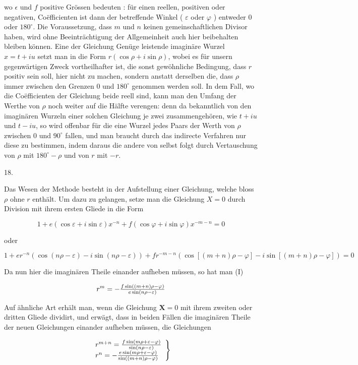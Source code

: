 \documentclass[twoside,12pt, showframe]{memoir}
\let\oldfrac\frac
\def\frac#1#2{\mathchoice{\tfrac{#1}{#2}}{\oldfrac{#1}{#2}}{\genfrac{}{}{}{2}{#1}{#2\mathstrut}}{\genfrac{}{}{}{3}{#1}{#2\mathstrut}}}
\begin{document}
wo \(\epsilon\) und \(f\) positive Grössen bedeuten : für einen reellen, positiven oder negativen, Coëfficienten ist dann der betreffende Winkel ( \(\varepsilon\) oder \(\varphi\) ) entweder 0 oder \(180^{\circ}\). Die Voraussetzung, dass \(m\) und \(n\) keinen gemeinschaftlichen Divisor haben, wird ohne Beeinträchtigung der Allgemeinheit auch hier beibehalten bleiben können. Eine der Gleichung Genüge leistende imaginäre Wurzel \(x=t+i u\) setzt man in die Form \(r(\cos \rho+i \sin \rho)\), wobei es für unsern gegenwärtigen Zweck
vortheilhafter ist, die sonst gewöhnliche Bedingung, dass \(r\) positiv sein soll, hier nicht zu machen, sondern anstatt derselben die, dass \(\rho\) immer zwischen den Grenzen 0 und \(180^{\circ}\) genommen werden soll. In dem Fall, wo die Coëfficienten der Gleichung beide reell sind, kann man den Umfang der Werthe von \(\rho\) noch weiter auf die Hälfte verengen: denn da bekanntlich von den imaginären Wurzeln einer solchen Gleichung je zwei zusammengehören, wie \(t+i u\) und \(t-i u\), so wird offenbar für die eine Wurzel jedes Paars der Werth von \(\rho\) zwischen 0 und \(90^{\circ}\) fallen, und man braucht durch das indirecte Verfahren nur diese zu bestimmen, indem daraus die andere von selbst folgt durch Vertauschung von \(\rho\) mit \(180^{\circ}-\rho\) und von \(r\) mit \(-r\).

18.

Das Wesen der Methode besteht in der Aufstellung einer Gleichung, welche bloss \(\rho\) ohne \(r\) enthält. Um dazu zu gelangen, setze man die Gleichung \(X=0\) durch Division mit ihrem ersten Gliede in die Form

\[
1+e(\cos \varepsilon+i \sin \varepsilon) x^{-n}+f(\cos \varphi+i \sin \varphi) x^{-m-n}=0
\]

oder

\(1+e r^{-n}(\cos (n \rho-\varepsilon)-i \sin (n \rho-\varepsilon))+f r^{-m-n}(\cos [(m+n) \rho-\varphi]-i \sin [(m+n) \rho-\varphi])=0\)

Da nun hier die imaginären Theile einander aufheben müssen, so hat man (I)

\[
r^{m}=-\frac{f \sin ((m+n) \rho-\varphi)}{e \sin (n \rho-\varepsilon)}
\]

Auf ähnliche Art erhält man, wenn die Gleichung \(\boldsymbol{X}=0\) mit ihrem zweiten oder dritten Gliede dividirt, und erwägt, dass in beiden Fällen die imaginären Theile der neuen Gleichungen einander aufheben müssen, die Gleichungen

\[
\left.\begin{array}{l}
r^{m+n}=\frac{f \sin (m \rho+\varepsilon-\varphi)}{\sin (n \rho-\varepsilon)} \\
r^{n}=-\frac{e \sin (m \rho+\varepsilon-\varphi)}{\sin ((m+n) \rho-\varphi)}
\end{array}\right\}
\]
\end{document}
